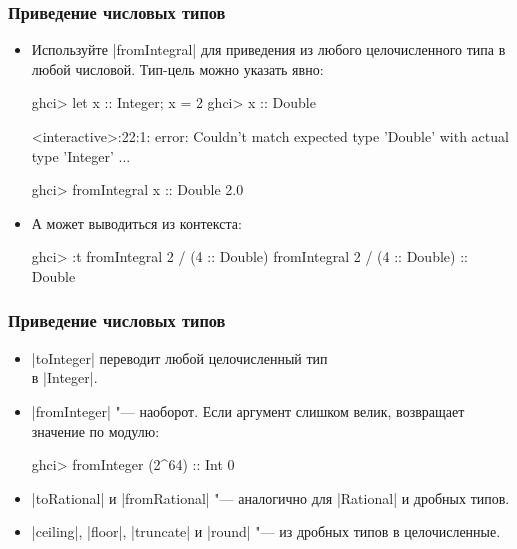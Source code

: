 \documentclass[10pt]{beamer}
\begin{document}
\begin{frame}[fragile]
  \frametitle{Приведение числовых типов}
  \begin{itemize}
    \item Используйте \haskinline|fromIntegral| для приведения из любого целочисленного типа в любой числовой. Тип-цель можно указать явно:
          \begin{haskell}
            ghci> let {x :: Integer; x = 2}
            ghci> x :: Double
          \end{haskell}
          \begin{ghci}
            <interactive>:22:1: error:
            Couldn't match expected type 'Double' with actual type 'Integer' ...
          \end{ghci}
          \begin{haskell}
            ghci> fromIntegral x :: Double
            2.0
          \end{haskell}
    \item А может выводиться из контекста:
          \begin{haskell}
            ghci> :t fromIntegral 2 / (4 :: Double)
            fromIntegral 2 / (4 :: Double) :: Double
          \end{haskell}
  \end{itemize}
\end{frame}

\begin{frame}[fragile]
  \frametitle{Приведение числовых типов}
  \begin{itemize}
    \item \haskinline|toInteger| переводит любой целочисленный тип \\в \haskinline|Integer|.
    \item \haskinline|fromInteger| "--- наоборот. Если аргумент слишком велик, возвращает значение по модулю:
          \begin{haskell}
            ghci> fromInteger (2^64) :: Int
            0
          \end{haskell}
    \item \haskinline|toRational| и \haskinline|fromRational| "--- аналогично для \haskinline|Rational| и дробных типов.
    \item \haskinline|ceiling|, \haskinline|floor|, \haskinline|truncate| и \haskinline|round| "--- из дробных типов в целочисленные.
  \end{itemize}
\end{frame}
\end{document}
